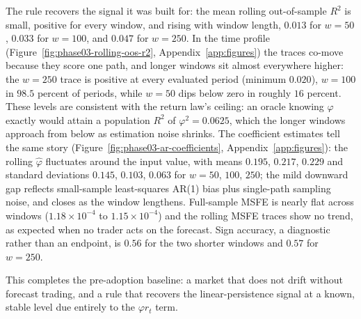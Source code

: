 \documentclass[12pt]{article}
\begin{document}
The rule recovers the signal it was built for: the mean rolling out-of-sample $R^{2}$ is small, positive for every window, and rising with window length, $0.013$ for $w=50$, $0.033$ for $w=100$, and $0.047$ for $w=250$. %
In the time profile (Figure~\ref{fig:phase03-rolling-oos-r2}, Appendix~\ref{app:figures}) the traces co-move because they score one path, and longer windows sit almost everywhere higher: the $w=250$ trace is positive at every evaluated period (minimum $0.020$), $w=100$ in $98.5$ percent of periods, while $w=50$ dips below zero in roughly $16$ percent. %
These levels are consistent with the return law's ceiling: an oracle knowing $\varphi$ exactly would attain a population $R^{2}$ of $\varphi^{2}=0.0625$, which the longer windows approach from below as estimation noise shrinks. %
The coefficient estimates tell the same story (Figure~\ref{fig:phase03-ar-coefficients}, Appendix~\ref{app:figures}): the rolling $\hat{\varphi}$ fluctuates around the input value, with means $0.195$, $0.217$, $0.229$ and standard deviations $0.145$, $0.103$, $0.063$ for $w=50$, $100$, $250$; the mild downward gap reflects small-sample least-squares AR(1) bias plus single-path sampling noise, and closes as the window lengthens. %
Full-sample MSFE is nearly flat across windows ($1.18\times10^{-4}$ to $1.15\times10^{-4}$) and the rolling MSFE traces show no trend, as expected when no trader acts on the forecast. %
Sign accuracy, a diagnostic rather than an endpoint, is $0.56$ for the two shorter windows and $0.57$ for $w=250$. %

This completes the pre-adoption baseline: a market that does not drift without forecast trading, and a rule that recovers the linear-persistence signal at a known, stable level due entirely to the $\varphi r_t$ term.
\end{document}
